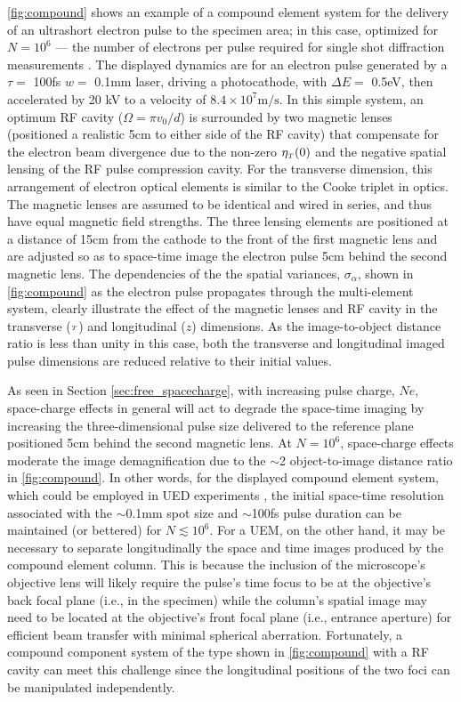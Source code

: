 \ref{fig:compound} shows an example of a compound element system for the delivery of an ultrashort electron pulse to the specimen area; in this case, optimized for $ N = 10^{ 6 } $ --- the number of electrons per pulse required for single shot diffraction measurements \cite{armstrong_practical_2007}.
The displayed dynamics are for an electron pulse generated by a $\tau = $ 100fs $w = $ 0.1mm laser, driving a photocathode, with $\Delta E = $ 0.5eV, then accelerated by 20 kV to a velocity of $8.4 \times 10^{7} \text{m}/\text{s}$.
In this simple system, an optimum RF cavity ($ \Omega = \pi v_{{ \scriptscriptstyle 0}} / d $) is surrounded by two magnetic lenses (positioned a realistic 5cm to either side of the RF cavity) that compensate for the electron beam divergence due to the non-zero $ \eta_{{\scriptscriptstyle T}} (0) $ and the negative spatial lensing of the RF pulse compression cavity.
For the transverse dimension, this arrangement of electron optical elements is similar to the Cooke triplet in optics.
The magnetic lenses are assumed to be identical and wired in series, and thus have equal magnetic field strengths.
The three lensing elements are positioned at a distance of 15cm from the cathode to the front of the first magnetic lens and are adjusted so as to space-time image the electron pulse 5cm behind the second magnetic lens.
The dependencies of the the spatial variances, $\sigma_{\alpha}$, shown in \ref{fig:compound} as the electron pulse propagates through the multi-element system, clearly illustrate the effect of the magnetic lenses and RF cavity in the transverse (${\scriptscriptstyle T}$) and longitudinal ($z$) dimensions.
As the image-to-object distance ratio is less than unity in this case, both the transverse and longitudinal imaged pulse dimensions are reduced relative to their initial values. %

As seen in Section \ref{sec:free_spacecharge}, with increasing pulse charge, $ N e $, space-charge effects in general will act to degrade the space-time imaging by increasing the three-dimensional pulse size delivered to the reference plane positioned 5cm behind the second magnetic lens.
At $ N = 10^{6} $, space-charge effects moderate the image demagnification due to the $\sim$2 object-to-image distance ratio in \ref{fig:compound}. 
In other words, for the displayed compound element system, which could be employed in UED experiments \cite{oudheusden_electron_2007}, the initial space-time resolution associated with the $\sim$0.1mm spot size and $\sim$100fs pulse duration can be maintained (or bettered) for $N \lesssim 10^{6} $.
For a UEM, on the other hand, it may be necessary to separate longitudinally the space and time images produced by the compound element column.
This is because the inclusion of the microscope's objective lens will likely require the pulse's time focus to be at the objective's back focal plane (i.e., in the specimen) while the column's spatial image may need to be located at the objective's front focal plane (i.e., entrance aperture) for efficient beam transfer with minimal spherical aberration.
Fortunately, a compound component system of the type shown in \ref{fig:compound} with a RF cavity can meet this challenge since the longitudinal positions of the two foci can be manipulated independently.


